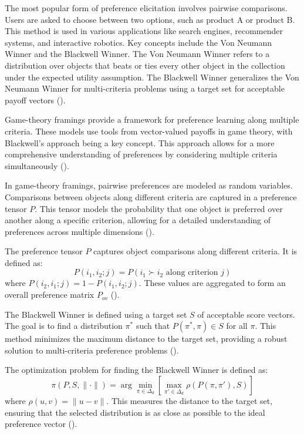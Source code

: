 \documentclass[
  letterpaper,
  numbers=noenddot,
  DIV=11]{scrreprt}
\theoremstyle{definition}
\theoremstyle{plain}
\theoremstyle{plain}
\theoremstyle{remark}
\begin{document}
The most popular form of preference elicitation involves pairwise
comparisons. Users are asked to choose between two options, such as
product A or product B. This method is used in various applications like
search engines, recommender systems, and interactive robotics. Key
concepts include the Von Neumann Winner and the Blackwell Winner. The
Von Neumann Winner refers to a distribution over objects that beats or
ties every other object in the collection under the expected utility
assumption. The Blackwell Winner generalizes the Von Neumann Winner for
multi-criteria problems using a target set for acceptable payoff vectors
().

Game-theory framings provide a framework for preference learning along
multiple criteria. These models use tools from vector-valued payoffs in
game theory, with Blackwell's approach being a key concept. This
approach allows for a more comprehensive understanding of preferences by
considering multiple criteria simultaneously
().

In game-theory framings, pairwise preferences are modeled as random
variables. Comparisons between objects along different criteria are
captured in a preference tensor \(P\). This tensor models the
probability that one object is preferred over another along a specific
criterion, allowing for a detailed understanding of preferences across
multiple dimensions ().

The preference tensor \(P\) captures object comparisons along different
criteria. It is defined as:
\[P(i_1, i_2; j) = P(i_1 \succ i_2 \text{ along criterion } j)\] where
\(P(i_2, i_1; j) = 1 - P(i_1, i_2; j)\). These values are aggregated to
form an overall preference matrix \(P_{ov}\)
().

The Blackwell Winner is defined using a target set \(S\) of acceptable
score vectors. The goal is to find a distribution \(\pi^*\) such that
\(P(\pi^*, \pi) \in S\) for all \(\pi\). This method minimizes the
maximum distance to the target set, providing a robust solution to
multi-criteria preference problems
().

The optimization problem for finding the Blackwell Winner is defined as:
\[\pi(P, S, \|\cdot\|) = \arg \min_{\pi \in \Delta_d} \left[ \max_{\pi' \in \Delta_d} \rho(P(\pi, \pi'), S) \right]\]
where \(\rho(u, v) = \|u - v\|\). This measures the distance to the
target set, ensuring that the selected distribution is as close as
possible to the ideal preference vector
().
\end{document}
